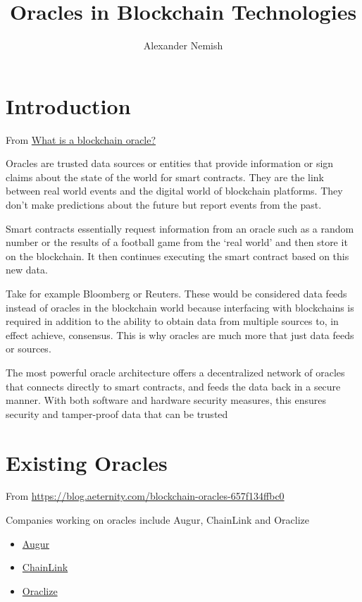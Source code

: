 \documentclass{article}
\title{Oracles in Blockchain Technologies}
\author{Alexander Nemish}
\begin{document}
\maketitle
\section{Introduction}

From
\href{https://blog.apla.io/what-is-a-blockchain-oracle-2ccca433c026}{What is a blockchain oracle?}

Oracles are trusted data sources or entities that provide information or sign claims about the state of the world for smart contracts.
They are the link between real world events and the digital world of blockchain platforms.
They don’t make predictions about the future but report events from the past.

Smart contracts essentially request information from an oracle such as a random number or the results of a football game from the ‘real world’ and then store it on the blockchain.
It then continues executing the smart contract based on this new data.

Take for example Bloomberg or Reuters.
These would be considered data feeds instead of oracles in the blockchain world because interfacing with blockchains is required in addition to the ability to obtain data from multiple sources to, in effect achieve, consensus.
This is why oracles are much more that just data feeds or sources.

The most powerful oracle architecture offers a decentralized network of oracles that connects directly to smart contracts, and feeds the data back in a secure manner. With both software and hardware security measures, this ensures security and tamper-proof data that can be trusted

\section{Existing Oracles}

From \url{https://blog.aeternity.com/blockchain-oracles-657f134ffbc0}

Companies working on oracles include Augur, ChainLink and Oraclize
\begin{itemize}
	\item \href{https://www.augur.net/}{Augur}
	\item \href{https://chain.link/}{ChainLink}
	\item \href{http://www.oraclize.it}{Oraclize}
\end{itemize}
\end{document}
